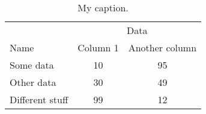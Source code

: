 \documentclass{article}
\begin{document}
\begin{table}
	\centering
	\begin{tabular}{lcc}
		\toprule
		& \multicolumn{2}{c}{Data} \\ \cmidrule(lr){2-3}
		Name & Column 1 & Another column \\
		\midrule
		Some data & 10 & 95 \\
		Other data & 30 & 49 \\
		\addlinespace
		Different stuff & 99 & 12 \\
		\bottomrule
	\end{tabular}
	\caption{My caption.}
	\label{tab-label}
\end{table}
\end{document}
